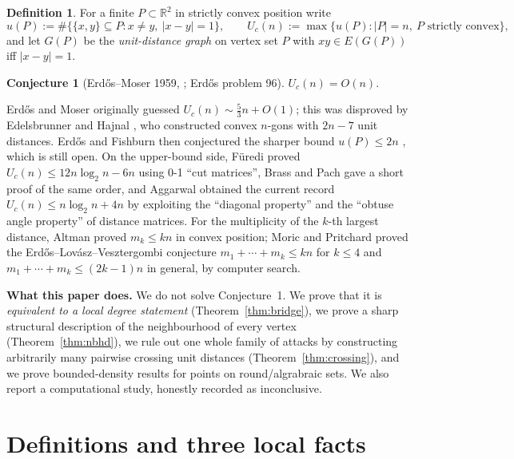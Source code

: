 \documentclass[11pt]{article}
\theoremstyle{definition}
\newtheorem{definition}{Definition}
\newtheorem{conjecture}{Conjecture}
\theoremstyle{remark}
\newcommand{\R}{\mathbb{R}}
\newcommand{\UC}{U_c}
\begin{document}
\begin{definition}
For a finite $P\subset\R^2$ in strictly convex position write
\[
u(P):=\#\bigl\{\{x,y\}\subseteq P : x\ne y,\ |x-y|=1\bigr\},
\qquad
\UC(n):=\max\{u(P): |P|=n,\ P\text{ strictly convex}\},
\]
and let $G(P)$ be the \emph{unit-distance graph} on vertex set $P$ with $xy\in E(G(P))$
iff $|x-y|=1$.
\end{definition}

\begin{conjecture}[Erd\H{o}s--Moser 1959, \cite{ErdosMoser1959}; Erd\H{o}s problem 96]
$\UC(n)=O(n)$.
\end{conjecture}

Erd\H{o}s and Moser originally guessed $\UC(n)\sim \tfrac53 n+O(1)$; this was disproved
by Edelsbrunner and Hajnal \cite{EdelsbrunnerHajnal1991}, who constructed convex
$n$-gons with $2n-7$ unit distances.  Erd\H{o}s and Fishburn then conjectured the
sharper bound $u(P)\le 2n$ \cite{Aggarwal2015, MoricPritchard2011}, which is still
open.  On the upper-bound side, F\"uredi \cite{Furedi1990} proved
$\UC(n)\le 12n\log_2 n-6n$ using 0-1 ``cut matrices'', Brass and Pach
\cite{BrassPach2001} gave a short proof of the same order, and Aggarwal
\cite{Aggarwal2015} obtained the current record $\UC(n)\le n\log_2 n+4n$ by exploiting
the ``diagonal property'' and the ``obtuse angle property'' of distance matrices.  For
the multiplicity of the $k$-th largest distance, Altman \cite{Altman1963,Altman1972}
proved $m_k\le kn$ in convex position; Moric and Pritchard \cite{MoricPritchard2011}
proved the Erd\H{o}s--Lov\'asz--Vesztergombi conjecture $m_1+\cdots+m_k\le kn$ for
$k\le4$ and $m_1+\cdots+m_k\le(2k-1)n$ in general, by computer search.

\smallskip
\noindent\textbf{What this paper does.}  We do not solve Conjecture~1.  We prove that
it is \emph{equivalent to a local degree statement} (Theorem~\ref{thm:bridge}), we
prove a sharp structural description of the neighbourhood of every vertex
(Theorem~\ref{thm:nbhd}), we rule out one whole family of attacks by constructing
arbitrarily many pairwise crossing unit distances (Theorem~\ref{thm:crossing}), and we
prove bounded-density results for points on round/algrabraic sets.  We also report a
computational study, honestly recorded as inconclusive.

\section{Definitions and three local facts}
\end{document}
